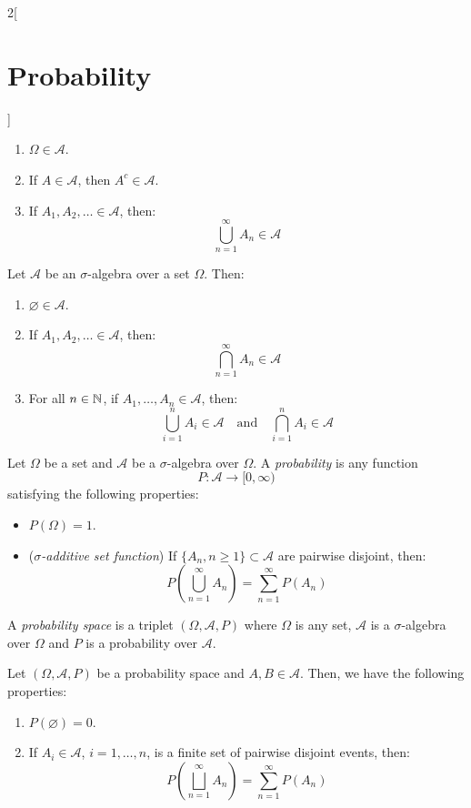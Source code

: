 \documentclass[../../../main.tex]{subfiles}
\begin{document}
\begin{multicols}{2}[\section{Probability}]
\begin{definition}
    \begin{enumerate}
      \item $\Omega\in\mathcal{A}$.
      \item If $A\in\mathcal{A}$, then $A^c\in\mathcal{A}$.
      \item If $A_1,A_2,\ldots\in\mathcal{A}$, then: $$\bigcup_{n=1}^\infty A_n\in\mathcal{A}$$
    \end{enumerate}
  \end{definition}
  \begin{prop}
    Let $\mathcal{A}$ be an $\sigma$-algebra over a set $\Omega$. Then:
    \begin{enumerate}
      \item $\varnothing\in\mathcal{A}$.
      \item If $A_1,A_2,\ldots\in\mathcal{A}$, then: $$\bigcap_{n=1}^\infty A_n\in\mathcal{A}$$
      \item For all $n\in\mathbb{N}$, if $A_1,\ldots,A_n\in\mathcal{A}$, then: $$\bigcup_{i=1}^nA_i\in\mathcal{A}\quad\text{and}\quad\bigcap_{i=1}^nA_i\in\mathcal{A}$$
    \end{enumerate}
  \end{prop}
  \begin{definition}
    Let $\Omega$ be a set and $\mathcal{A}$ be a $\sigma$-algebra over $\Omega$. A \textit{probability} is any function $$P:\mathcal{A}\longrightarrow[0,\infty)$$ satisfying the following properties:
    \begin{itemize}
      \item $P(\Omega)=1$.
      \item (\textit{$\sigma$-additive set function}) If $\{A_n,n\geq1\}\subset\mathcal{A}$ are pairwise disjoint, then: $$P\left(\bigcup_{n=1}^\infty A_n\right)=\sum_{n=1}^\infty P(A_n)$$
    \end{itemize}
  \end{definition}
  \begin{definition}
    A \textit{probability space} is a triplet $(\Omega,\mathcal{A},P)$ where $\Omega$ is any set, $\mathcal{A}$ is a $\sigma$-algebra over $\Omega$ and $P$ is a probability over $\mathcal{A}$.
  \end{definition}
  \begin{prop}
    Let $(\Omega,\mathcal{A},P)$ be a probability space and $A,B\in\mathcal{A}$. Then, we have the following properties:
    \begin{enumerate}
      \item $P(\varnothing)=0$.
      \item If $A_i\in\mathcal{A}$, $i=1,\ldots,n$, is a finite set of pairwise disjoint events, then: $$P\left(\bigsqcup_{n=1}^\infty A_n\right)=\sum_{n=1}^\infty P(A_n)$$

\end{enumerate}
\end{prop}
\end{multicols}
\end{document}
